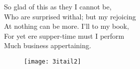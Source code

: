 
\begin{verse_speech}[Prospero] 
So glad of this as they I cannot be,\\
Who are surprised withal; but my rejoicing\\
At nothing can be more. I'll to my book,\\
For yet ere supper-time must I perform\\
Much business appertaining.
\end{verse_speech}
\exit{}

\begin{figure}[b]
\centering
\texttt{[image: 3itail2]}
\end{figure}

	